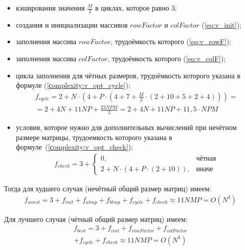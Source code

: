 \begin{itemize}[label=---]
	\item кэширования значения $\frac{M}{2}$ в циклах, которое равно 3;
	\item создания и инициализации массивов $rowFactor$ и $colFactor$ (\ref{eq:v_init});
	\item заполнения массива $rowFactor$, трудоёмкость которого (\ref{eq:v_rowF});
	\item заполнения массива $colFactor$, трудоёмкость которого (\ref{eq:v_colF});
	\item цикла заполнения для чётных размеров, трудоёмкость которого указана в формуле (\ref{сomplexity:v_opt_cycle});
	\begin{equation}
		\label{сomplexity:v_opt_cycle}
		\begin{aligned}
			f_{cycle} = 2 + N \cdot (4 + P \cdot (4 + 7 + \frac{M}{2} \cdot (2 + 10 + 5 + 2 + 4))) = \\
			= 2 + 4N + 11NP + \frac{23NPM}{2}  = 2 + 4N + 11NP + 11,5 \cdot NPM 
		\end{aligned}
	\end{equation}
	\item условия, которое нужно для дополнительных вычислений при нечётном размере матрицы, трудоемкость которого указана в формуле~(\ref{сomplexity:v_opt_check});
	\begin{equation}
		\label{сomplexity:v_opt_check}
		\begin{aligned}
			f_{check} = 3 + 
			\begin{cases}
				0, & \text{чётная} \\
				2 + N \cdot (4 + P \cdot (2 + 10)), & \text{иначе}
			\end{cases}
		\end{aligned}  
	\end{equation}
\end{itemize}

Тогда для худшего случая (нечётный общий размер матриц) имеем:
\begin{equation}
	\label{сomplexity:vinograd_opt_worst}
	\begin{aligned}
		f_{worst} = 3 + f_{init} + f_{atmp} + f_{btmp} + f_{cycle} + f_{check} \approx 11NMP = O(N^3)
	\end{aligned}
\end{equation}

Для лучшего случая (чётный общий размер матриц) имеем:
\begin{equation}
	\label{сomplexity:vinograd_opt_best}
	\begin{aligned}
		f_{best} = 3 + f_{init} + f_{rowFactor} + f_{colFactor} \\
		 + f_{cycle} + f_{check} \approx 11NMP = O(N^3)
	\end{aligned}
\end{equation}

